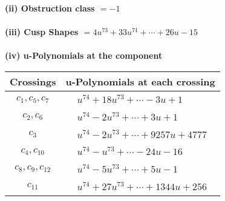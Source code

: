 \documentclass[1p]{elsarticle_modified}
\theoremstyle{definition}
\begin{document}
\flushleft \textbf{(ii) Obstruction class $= -1$}\\~\\
\flushleft \textbf{(iii) Cusp Shapes $= 4 u^{73}+33 u^{71}+\cdots+26 u-15$}\\~\\
\newpage\renewcommand{\arraystretch}{1}
\flushleft \textbf{(iv) u-Polynomials at the component}\newline \\
\begin{tabular}{m{50pt}|m{274pt}}
Crossings & \hspace{64pt}u-Polynomials at each crossing \\
\hline $$\begin{aligned}c_{1},c_{5},c_{7}\end{aligned}$$&$\begin{aligned}
&u^{74}+18 u^{73}+\cdots-3 u+1
\end{aligned}$\\
\hline $$\begin{aligned}c_{2},c_{6}\end{aligned}$$&$\begin{aligned}
&u^{74}-2 u^{73}+\cdots+3 u+1
\end{aligned}$\\
\hline $$\begin{aligned}c_{3}\end{aligned}$$&$\begin{aligned}
&u^{74}-2 u^{73}+\cdots+9257 u+4777
\end{aligned}$\\
\hline $$\begin{aligned}c_{4},c_{10}\end{aligned}$$&$\begin{aligned}
&u^{74}- u^{73}+\cdots-24 u-16
\end{aligned}$\\
\hline $$\begin{aligned}c_{8},c_{9},c_{12}\end{aligned}$$&$\begin{aligned}
&u^{74}-5 u^{73}+\cdots+5 u-1
\end{aligned}$\\
\hline $$\begin{aligned}c_{11}\end{aligned}$$&$\begin{aligned}
&u^{74}+27 u^{73}+\cdots+1344 u+256
\end{aligned}$\\
\hline
\end{tabular}\\~\\
\end{document}
